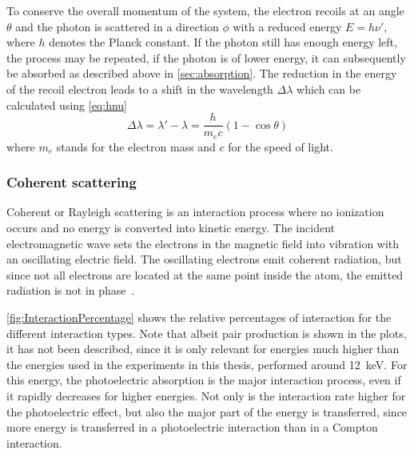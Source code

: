 To conserve the overall momentum of the system, the electron recoils at an angle $\theta$ and the photon is scattered in a direction $\phi$ with a reduced energy $E=h\nu'$, where $h$ denotes the Planck constant. If the photon still has enough energy left, the process may be repeated, if the photon is of lower energy, it can subsequently be absorbed as described above in \autoref{sec:absorption}. The reduction in the energy of the recoil electron leads to a shift in the wavelength $\Delta\lambda$ which can be calculated using \autoref{eq:hnu}
\begin{equation}
	\Delta\lambda = \lambda' - \lambda = \frac{h}{m_e c}(1-\cos{\theta})
	\label{eq:hnu}
\end{equation}
where $m_e$ stands for the electron mass and $c$ for the speed of light.

\subsubsection{Coherent scattering}
Coherent or Rayleigh scattering is an interaction process where no ionization occurs and no energy is converted into kinetic energy. The incident electromagnetic wave sets the electrons in the magnetic field into vibration with an oscillating electric field. The oscillating electrons emit coherent radiation, but since not all electrons are located at the same point inside the atom, the emitted radiation is not in phase~\cite{Hsieh2003,Stampanoni2002}.

\autoref{fig:InteractionPercentage} shows the relative percentages of interaction for the different interaction types. Note that albeit pair production is shown in the plots, it has not been described, since it is only relevant for energies much higher than the energies used in the experiments in this thesis, performed around \SI{12}{\kilo\electronvolt}. For this energy, the photoelectric absorption is the major interaction process, even if it rapidly decreases for higher energies. Not only is the interaction rate higher for the photoelectric effect, but also the major part of the energy is transferred, since more energy is transferred in a photoelectric interaction than in a Compton interaction.

